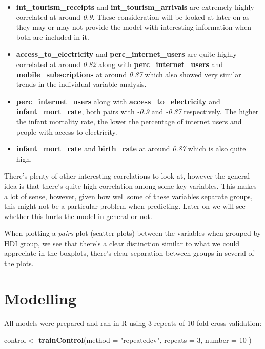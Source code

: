 \documentclass[]{article}
\newenvironment{Shaded}{\begin{snugshade}}{\end{snugshade}}
\newcommand{\DataTypeTok}[1]{\textcolor[rgb]{0.13,0.29,0.53}{#1}}
\newcommand{\DecValTok}[1]{\textcolor[rgb]{0.00,0.00,0.81}{#1}}
\newcommand{\KeywordTok}[1]{\textcolor[rgb]{0.13,0.29,0.53}{\textbf{#1}}}
\newcommand{\NormalTok}[1]{#1}
\newcommand{\StringTok}[1]{\textcolor[rgb]{0.31,0.60,0.02}{#1}}
\providecommand{\tightlist}{%
  \setlength{\itemsep}{0pt}\setlength{\parskip}{0pt}}
\begin{document}
\begin{itemize}
\tightlist
\item
  \textbf{int\_tourism\_receipts} and \textbf{int\_tourism\_arrivals}
  are extremely highly correlated at around \emph{0.9}. These
  consideration will be looked at later on as they may or may not
  provide the model with interesting information when both are included
  in it.
\item
  \textbf{access\_to\_electricity} and \textbf{perc\_internet\_users}
  are quite highly correlated at around \emph{0.82} along with
  \textbf{perc\_internet\_users} and \textbf{mobile\_subscriptions} at
  around \emph{0.87} which also showed very similar trends in the
  individual variable analysis.\\
\item
  \textbf{perc\_internet\_users} along with
  \textbf{access\_to\_electricity} and \textbf{infant\_mort\_rate}, both
  pairs with \emph{-0.9} and \emph{-0.87} respectively. The higher the
  infant mortality rate, the lower the percentage of internet users and
  people with access to electricity.
\item
  \textbf{infant\_mort\_rate} and \textbf{birth\_rate} at around
  \emph{0.87} which is also quite high.
\end{itemize}

There's plenty of other interesting correlations to look at, however the
general idea is that there's quite high correlation among some key
variables. This makes a lot of sense, however, given how well some of
these variables separate groups, this might not be a particular problem
when predicting. Later on we will see whether this hurts the model in
general or not.

When plotting a \emph{pairs} plot (scatter plots) between the variables
when grouped by HDI group, we see that there's a clear distinction
similar to what we could appreciate in the boxplots, there's clear
separation between groups in several of the plots.

\newpage

\hypertarget{modelling}{%
\section{Modelling}\label{modelling}}

All models were prepared and ran in R using 3 repeats of 10-fold cross
validation:

\footnotesize

\begin{Shaded}
\begin{Highlighting}[]
\NormalTok{control <-}\StringTok{ }\KeywordTok{trainControl}\NormalTok{(}\DataTypeTok{method =} \StringTok{"repeatedcv"}\NormalTok{,}
                        \DataTypeTok{repeats =} \DecValTok{3}\NormalTok{,}
                        \DataTypeTok{number =} \DecValTok{10}\NormalTok{ )}
\end{Highlighting}
\end{Shaded}
\end{document}
